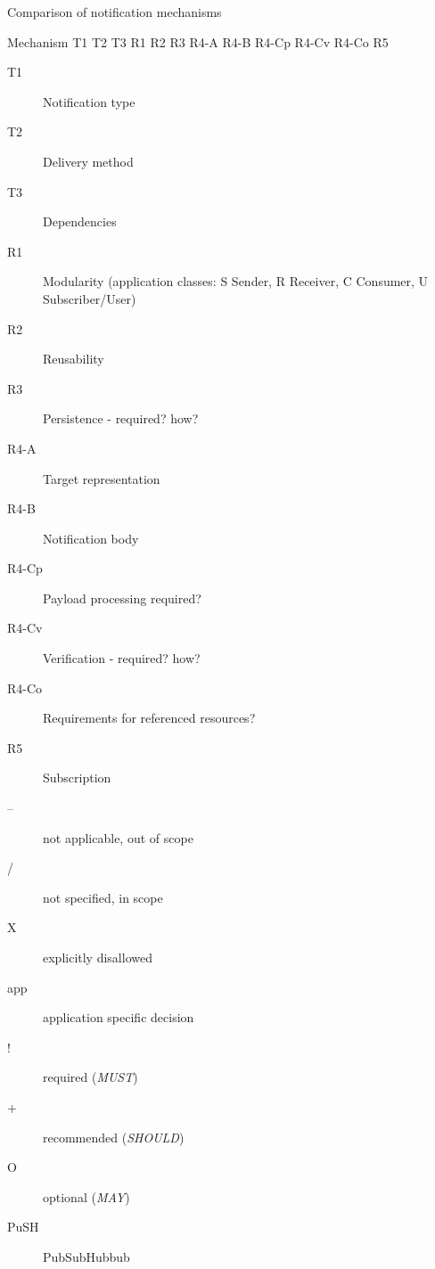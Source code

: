 \documentclass[a4paper]{llncs}
\begin{document}
                                    
                                        Comparison of notification mechanisms
                                        
                                            
                                                Mechanism
                                                T1
                                                T2
                                                T3
                                                R1
                                                R2
                                                R3
                                                R4-A
                                                R4-B
                                                R4-Cp
                                                R4-Cv
                                                R4-Co
                                                R5
                                            
                                        
                                        
                                            
                                                
                                                    \begin{description}
  \item[T1] Notification type\item[T2] Delivery method\item[T3] Dependencies\item[R1] Modularity (application classes: S Sender, R Receiver, C Consumer, U Subscriber/User)\item[R2] Reusability\item[R3] Persistence - required? how?\item[R4-A] Target representation\item[R4-B] Notification body\item[R4-Cp] Payload processing required?\item[R4-Cv] Verification - required? how?\item[R4-Co] Requirements for referenced resources?\item[R5] Subscription
    \end{description}
  
                                                    
                                                    \begin{description}
  \item[–] not applicable, out of scope\item[/] not specified, in scope\item[X] explicitly disallowed\item[app] application specific decision\item[!] required ({\em MUST})\item[+] recommended ({\em SHOULD})\item[O] optional ({\em MAY})\item[PuSH] PubSubHubbub
    \end{description}
  
\end{document}
